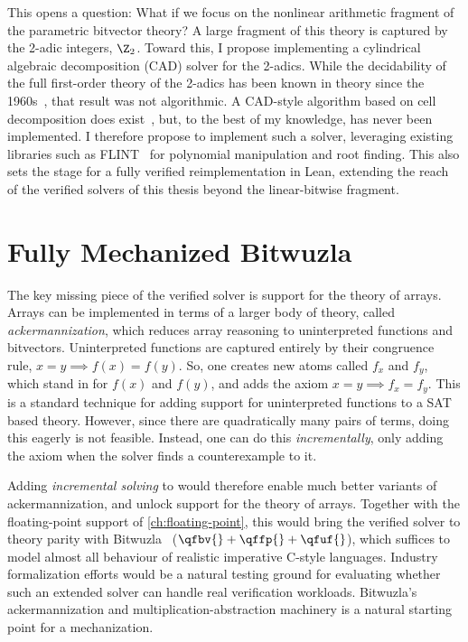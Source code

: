 This opens a question: What if we focus on the nonlinear arithmetic fragment of the parametric bitvector theory?
A large fragment of this theory is captured by the 2-adic integers, $\Z_2$.
Toward this, I propose implementing a cylindrical algebraic decomposition (CAD) solver for the 2-adics.
While the decidability of the full first-order theory of the 2-adics has been known in theory since the
1960s~\citep{ax1966diophantine}, that result was not algorithmic. A CAD-style
algorithm based on cell decomposition does exist~\citep{quantifier-elimination-padic},
but, to the best of my knowledge, has never been implemented. I therefore propose to implement
such a solver, leveraging existing libraries such as FLINT~\citep{hart2013flint} for polynomial manipulation and root finding.
This also sets the stage for a fully verified reimplementation in Lean, extending
the reach of the verified solvers of this thesis beyond the linear-bitwise fragment.

\section{Fully Mechanized Bitwuzla}

The key missing piece of the verified solver is support for the theory of arrays.
Arrays can be implemented in terms of a larger body of theory, called \emph{ackermannization},
which reduces array reasoning to uninterpreted functions and bitvectors.
Uninterpreted functions are captured entirely by their congruence rule,
$x = y \implies f(x) = f(y)$. So, one creates new atoms called $f_x$ and $f_y$, which stand in for $f(x)$ and $f(y)$, and adds the axiom
$x = y \implies f_x = f_y$. This is a standard technique for adding support for uninterpreted functions to a SAT based theory.
However, since there are quadratically many pairs of terms,
doing this eagerly is not feasible.
Instead, one can do this \emph{incrementally}, only adding the axiom when the solver finds a counterexample to it.

Adding \emph{incremental solving} to \bvdecide{} would therefore enable much better
variants of ackermannization, and unlock support for the theory of
arrays. Together with the floating-point support of \cref{ch:floating-point},
this would bring the verified solver to theory parity with
Bitwuzla~\citep{niemetz2023bitwuzla} ($\qfbv{} + \qffp{} + \qfuf{}$),
which suffices to model almost all behaviour of realistic imperative C-style languages.
Industry formalization efforts would be a natural testing ground for
evaluating whether such an extended solver can handle real verification
workloads. Bitwuzla's ackermannization and multiplication-abstraction
machinery is a natural starting point for a mechanization.

